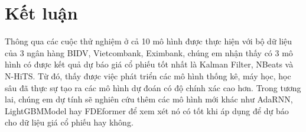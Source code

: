 \section{Kết luận}
Thông qua các cuộc thử nghiệm ở cả 10 mô hình được thực hiện với bộ dữ liệu của 3 ngân hàng BIDV, Vietcombank, Eximbank, chúng em nhận thấy có 3 mô hình có được kết quả dự báo giá cổ phiếu tốt nhất là Kalman Filter, NBeats và N-HiTS. Từ đó, thấy được việc phát triển các mô hình thống kê, máy học, học sâu đã thực sự tạo ra các mô hình dự đoán có độ chính xác cao hơn. Trong tương lai, chúng em dự tính sẽ nghiên cứu thêm các mô hình mới khác như AdaRNN, LightGBMModel hay FDEformer để xem xét nó có tốt khi áp dụng để dự báo cho dữ liệu giá cổ phiếu hay không.
